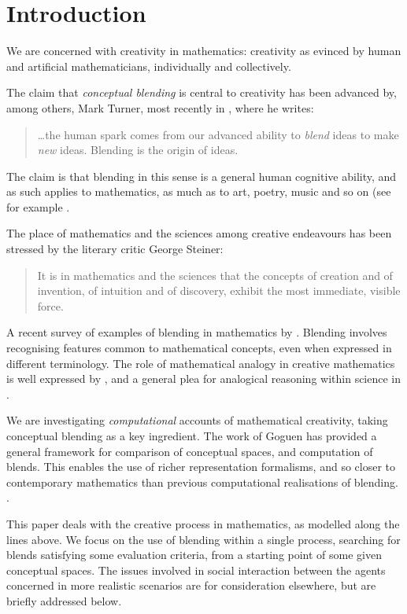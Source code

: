 \section{Introduction}
\label{sec:intro}

We are concerned with creativity in mathematics: creativity
as evinced by human and artificial mathematicians,
individually and collectively.

The claim that \emph{conceptual blending} is central to creativity
has been advanced by, among others, Mark Turner, most recently
in \textcite{MTurner14}, where he writes:
\begin{quote}
  \dots the human spark comes from our advanced ability to \emph{blend} ideas
  to make \emph{new} ideas. Blending is the origin of ideas.%
  \hfill \parencite[p 2]{MTurner14}
\end{quote}
The claim is that blending in this sense is a general human cognitive
ability, and as such applies to mathematics, as much as to art, poetry,
music and so on (see for example \textcite{MTurner05}.

The place of mathematics and the sciences among creative endeavours
has been stressed by the literary critic George Steiner:
\begin{quote}
  It is in mathematics and the sciences that the concepts of
creation and of invention, of intuition and of discovery,
exhibit the most immediate, visible force.
\end{quote}
A recent survey of examples of blending in mathematics by
\textcite{Al11i}.  Blending involves recognising features common
to mathematical concepts, even when expressed in different
terminology.  The role of mathematical analogy in creative mathematics
is well expressed by \textcite{Weil60}, and a general plea for
analogical reasoning within science in \cite{ArbibHesse86}.

We are investigating \emph{computational} accounts of mathematical
creativity, taking conceptual blending as a key ingredient.  The work
of Goguen \parencite{Gog99,Gog05,Gog05b} has provided a general framework for
comparison of conceptual spaces, and computation of blends.  This
enables the use of richer representation formalisms, and so closer to
contemporary mathematics than previous computational realisations of
blending. .

This paper deals with the creative process in mathematics, as modelled
along the lines above. We focus on the use of blending within a single
process, searching for blends satisfying some evaluation criteria,
from a starting point of some given conceptual spaces. The issues
involved in social interaction between the agents concerned in more
realistic scenarios are for consideration elsewhere, but are briefly
addressed below.

